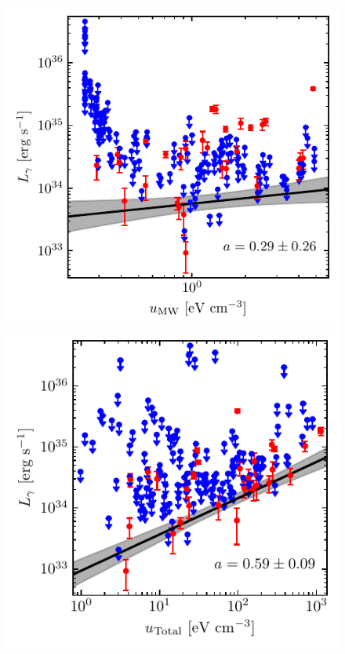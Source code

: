 \documentclass[doublespace,draft,nopageskip]{VTthesis} %
\begin{document}
\begin{figure}
    \centering
    \includegraphics[width=\columnwidth]{Figures/Globular/correlation/L_gamma_vs_isrf_urad.pdf}
    \includegraphics[width=\columnwidth]{Figures/Globular/correlation/L_gamma_vs_total_urad.pdf}

\end{figure}
\end{document}
